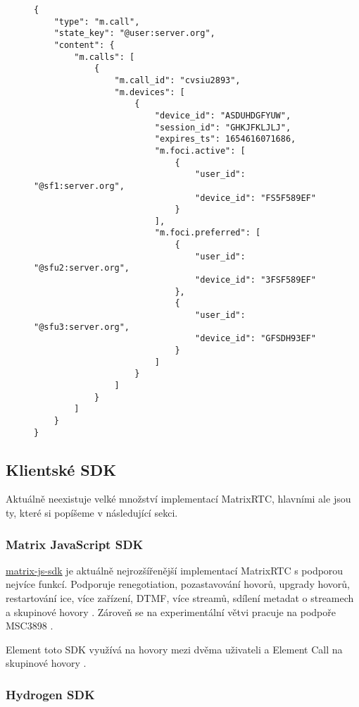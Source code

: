 
\begin{figure}[H]
    \begin{verbatim}
{
	"type": "m.call",
	"state_key": "@user:server.org",
	"content": {
		"m.calls": [
			{
				"m.call_id": "cvsiu2893",
				"m.devices": [
					{
						"device_id": "ASDUHDGFYUW",
						"session_id": "GHKJFKLJLJ",
						"expires_ts": 1654616071686,
						"m.foci.active": [
							{ 
								"user_id": "@sf1:server.org", 
								"device_id": "FS5F589EF" 
							}
						],
						"m.foci.preferred": [
							{ 
								"user_id": "@sfu2:server.org", 
								"device_id": "3FSF589EF" 
							},
							{ 
								"user_id": "@sfu3:server.org", 
								"device_id": "GFSDH93EF" 
							}
						]	
					}
				]
			}
		]
	}
}
	\end{verbatim}
\end{figure}

\subsection{Klientské SDK}

Aktuálně neexistuje velké množství implementací MatrixRTC, hlavními ale jsou ty,
které si popíšeme v následující sekci.

\subsubsection{Matrix JavaScript SDK}\label{matrix-js-sdk}

\href{https://github.com/matrix-org/matrix-js-sdk/}{matrix-js-sdk} je aktuálně
nejrozšířenější implementací MatrixRTC s podporou nejvíce funkcí. Podporuje
renegotiation, pozastavování hovorů, upgrady hovorů, restartování \gls{ice},
více zařízení, DTMF, více streamů, sdílení metadat o streamech a skupinové
hovory \parencite{GitHub-MatrixJSSDK}. Zároveň se na experimentální větvi
pracuje na podpoře MSC3898 \parencite{GitHub-MatrixJSSDK-MSC3898}.

Element toto SDK využívá na hovory mezi dvěma uživateli a Element Call na
skupinové hovory
\parencite{GitHub-ElementCall,GitHub-ElementWeb,GitHub-MatrixReactSDK}.

\subsubsection{Hydrogen SDK}

